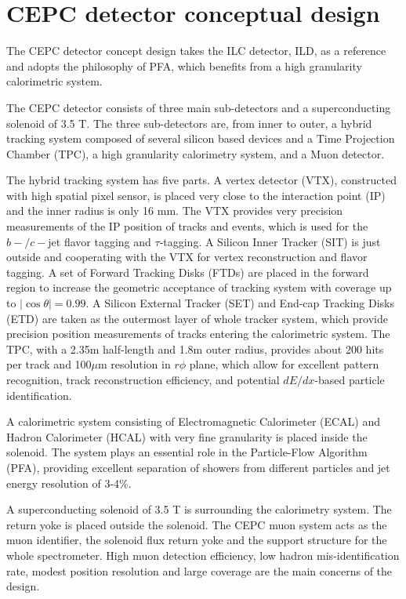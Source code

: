 \documentclass[a4paper,10pt,twoside]{cpc-hepnp}
\begin{document}
\section{CEPC detector conceptual design\label{sec:detector}}

The CEPC detector concept design\cite{ref:cepc_det}  takes the ILC detector, ILD\cite{ref:ilc, ref:ild},  as a reference and adopts the philosophy of PFA, which benefits from a high granularity  calorimetric system. 

The CEPC detector consists of three main sub-detectors and a superconducting solenoid of 3.5 T.  The three sub-detectors are, from inner to outer,  a hybrid tracking system composed of several silicon based devices and a Time Projection Chamber (TPC), a high granularity calorimetry system, and a Muon detector. 

The hybrid tracking system has five parts.  A vertex detector (VTX), constructed with high spatial pixel sensor, is placed very close to the interaction point (IP) and  the inner radius is only 16 mm. The VTX provides very precision measurements of the IP position of tracks and events, which is used for the $b-/c-$jet flavor tagging and $\tau$-tagging.  A Silicon Inner Tracker (SIT) is just outside  and cooperating with the VTX for vertex reconstruction and flavor tagging. A set of Forward Tracking Disks (FTDs)  are placed in the forward region to increase the geometric acceptance of tracking system with coverage up to $|\cos\theta| = 0.99$.  A Silicon External Tracker (SET) and End-cap Tracking Disks (ETD) are taken as the outermost layer of whole tracker system, which provide precision position measurements of tracks entering the calorimetric system.  The TPC, with a 2.35m half-length and 1.8m outer radius, provides about 200 hits per track and 100$\mu$m resolution in $r\phi$ plane, which allow for excellent pattern recognition,  track reconstruction efficiency, and potential $dE/dx$-based particle identification. 

A calorimetric system consisting of Electromagnetic Calorimeter (ECAL) and Hadron Calorimeter (HCAL) with very fine granularity is placed inside the solenoid. The system plays an essential role in the Particle-Flow Algorithm (PFA), providing excellent separation of showers from different particles and jet energy resolution of 3-4\%. 

A superconducting solenoid of 3.5 T is surrounding the calorimetry system. The return yoke is placed outside the solenoid. The CEPC muon system acts as the muon identifier, the solenoid flux return yoke and the support structure for the whole spectrometer. High muon detection efficiency, low hadron mis-identification rate, modest position resolution and large coverage are the main concerns of the design.
\end{document}

